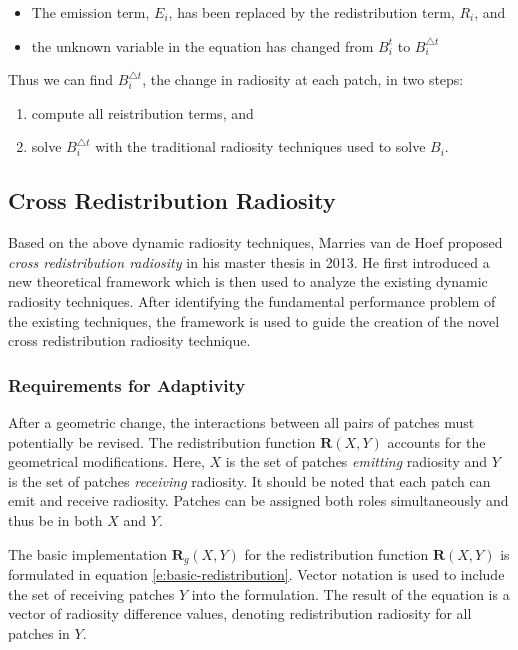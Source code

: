 \begin{itemize}
	\item The emission term, $E_i$, has been replaced by the redistribution term, $R_i$, and
	\item the unknown variable in the equation has changed from $B^{t}_i$ to $B^{\triangle t}_i$
\end{itemize} 

Thus we can find $B^{\triangle t}_i$, the change in radiosity at each patch, in two steps:

\begin{enumerate}
	\item compute all reistribution terms, and 
	\item solve $B^{\triangle t}_i$ with the traditional radiosity techniques used to solve $B_i$.
\end{enumerate}





\subsection{Cross Redistribution Radiosity}
Based on the above dynamic radiosity techniques, Marries van de Hoef proposed \textit{cross redistribution radiosity}\cite{a:Real-TimeDynamicRadiosityforHighQualityGlobalIllumination} in his master thesis in 2013. He first introduced a new theoretical framework which is then used to analyze the existing dynamic radiosity techniques. After identifying the fundamental performance problem of the existing techniques, the framework is used to guide the creation of the novel cross redistribution radiosity technique.


\subsubsection{Requirements for Adaptivity}
After a geometric change, the interactions between all pairs of patches must potentially be revised. The redistribution function $\mathbf{R}(X,Y)$ accounts for the geometrical modifications. Here, $X$ is the set of patches \textit{emitting} radiosity and $Y$ is the set of patches \textit{receiving} radiosity. It should be noted that each patch can emit and receive radiosity. Patches can be assigned both roles simultaneously and thus be in both $X$ and $Y$.

The basic implementation $\mathbf{R}_g(X,Y)$ for the redistribution function $\mathbf{R}(X,Y)$ is formulated in equation \ref{e:basic-redistribution}. Vector notation is used to include the set of receiving patches $Y$ into the formulation. The result of the equation is a vector of radiosity difference values, denoting redistribution radiosity for all patches in $Y$.

